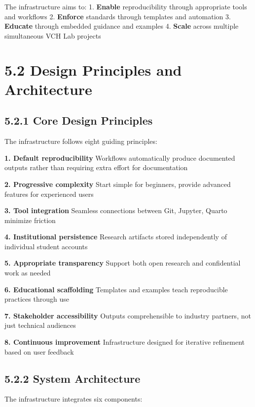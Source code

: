 \documentclass[
  oneside,
  open=any]{scrbook}
\begin{document}
The infrastructure aims to: 1. \textbf{Enable} reproducibility through
appropriate tools and workflows 2. \textbf{Enforce} standards through
templates and automation 3. \textbf{Educate} through embedded guidance
and examples 4. \textbf{Scale} across multiple simultaneous VCH Lab
projects

\section{5.2 Design Principles and
Architecture}\label{design-principles-and-architecture}

\subsection{5.2.1 Core Design Principles}\label{core-design-principles}

The infrastructure follows eight guiding principles:

\textbf{1. Default reproducibility} Workflows automatically produce
documented outputs rather than requiring extra effort for documentation

\textbf{2. Progressive complexity} Start simple for beginners, provide
advanced features for experienced users

\textbf{3. Tool integration} Seamless connections between Git, Jupyter,
Quarto minimize friction

\textbf{4. Institutional persistence} Research artifacts stored
independently of individual student accounts

\textbf{5. Appropriate transparency} Support both open research and
confidential work as needed

\textbf{6. Educational scaffolding} Templates and examples teach
reproducible practices through use

\textbf{7. Stakeholder accessibility} Outputs comprehensible to industry
partners, not just technical audiences

\textbf{8. Continuous improvement} Infrastructure designed for iterative
refinement based on user feedback

\subsection{5.2.2 System Architecture}\label{system-architecture}

The infrastructure integrates six components:
\end{document}
